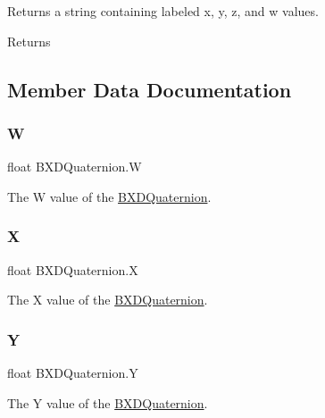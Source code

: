 Returns a string containing labeled x, y, z, and w values. 

\begin{DoxyReturn}{Returns}

\end{DoxyReturn}


\subsection{Member Data Documentation}
\mbox{\label{class_b_x_d_quaternion_a041db6f6882e5480d333bddb9bc2f4f1}} 
\subsubsection{\texorpdfstring{W}{W}}
{\footnotesize\ttfamily float B\+X\+D\+Quaternion.\+W}



The W value of the \hyperlink{class_b_x_d_quaternion}{B\+X\+D\+Quaternion}. 

\mbox{\label{class_b_x_d_quaternion_a37535ef51676bd109b9c13049230696b}} 
\subsubsection{\texorpdfstring{X}{X}}
{\footnotesize\ttfamily float B\+X\+D\+Quaternion.\+X}



The X value of the \hyperlink{class_b_x_d_quaternion}{B\+X\+D\+Quaternion}. 

\mbox{\label{class_b_x_d_quaternion_a372aeace6dc0ec9659e10da7ec95e793}} 
\subsubsection{\texorpdfstring{Y}{Y}}
{\footnotesize\ttfamily float B\+X\+D\+Quaternion.\+Y}



The Y value of the \hyperlink{class_b_x_d_quaternion}{B\+X\+D\+Quaternion}. 


